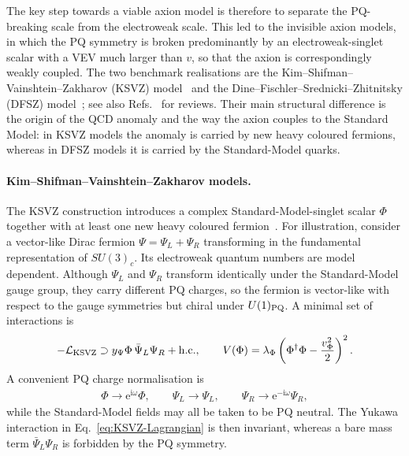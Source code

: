 \documentclass[review]{elsarticle}
\numberwithin{equation}{section}
\numberwithin{table}{section}
\numberwithin{figure}{section}
\def\i{\mathrm{i}}
\def\e{\mathrm{e}}
\def\hc{{\rm h.c.}}
\begin{document}
The key step towards a viable axion model is therefore to separate the PQ-breaking scale from the electroweak scale. This led to the invisible axion models, in which the PQ symmetry is broken predominantly by an electroweak-singlet scalar with a VEV much larger than $v$, so that the axion is correspondingly weakly coupled. The two benchmark realisations are the Kim--Shifman--Vainshtein--Zakharov (KSVZ) model~\cite{Kim:1979if,Shifman:1979if} and the Dine--Fischler--Srednicki--Zhitnitsky (DFSZ) model~\cite{Zhitnitsky:1980tq,Dine:1981rt}; see also Refs.~\cite{Kim:2008hd,DiLuzio:2020wdo,Choi:2020rgn} for reviews. Their main structural difference is the origin of the QCD anomaly and the way the axion couples to the Standard Model: in KSVZ models the anomaly is carried by new heavy coloured fermions, whereas in DFSZ models it is carried by the Standard-Model quarks.

\paragraph{Kim--Shifman--Vainshtein--Zakharov models.}

The KSVZ construction introduces a complex Standard-Model-singlet scalar $\Phi$ together with at least one new heavy coloured fermion~\cite{Kim:1979if,Shifman:1979if}. For illustration, consider a vector-like Dirac fermion $\Psi=\Psi_L+\Psi_R$ transforming in the fundamental representation of $SU(3)_c$. Its electroweak quantum numbers are model dependent. Although $\Psi_L$ and $\Psi_R$ transform identically under the Standard-Model gauge group, they carry different PQ charges, so the fermion is vector-like with respect to the gauge symmetries but chiral under $U(1)_{\rm PQ}$. A minimal set of interactions is
\begin{align}
    -\mathcal{L}_{\rm KSVZ}
    \supset y_\Psi\Phi\,\bar\Psi_L\Psi_R +\hc ,
    \qquad
    V(\Phi) = \lambda_\Phi \left( \Phi^\dagger\Phi-\frac{v_\Phi^2}{2} \right)^2 .
    \label{eq:KSVZ-Lagrangian}
\end{align}
A convenient PQ charge normalisation is
\begin{align}
    \Phi\rightarrow\e^{\i\omega}\Phi,
    \qquad
    \Psi_L\rightarrow\Psi_L,
    \qquad
    \Psi_R\rightarrow\e^{-\i\omega}\Psi_R,
    \label{eq:KSVZ-PQ-transformation}
\end{align}
while the Standard-Model fields may all be taken to be PQ neutral. The Yukawa interaction in Eq.~\eqref{eq:KSVZ-Lagrangian} is then invariant, whereas a bare mass term $\bar\Psi_L\Psi_R$ is forbidden by the PQ symmetry.
\end{document}
